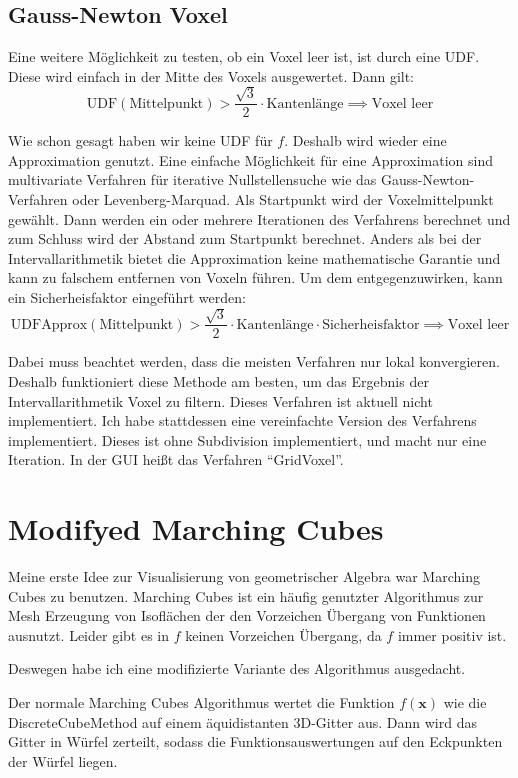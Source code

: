 \documentclass[
	ngerman,%
	accentcolor=9c,%
	ruledheaders=section,%
	class=report,%
	thesis={type=bachelor},%
	fontsize=11pt,%
	parskip=half-,%
	custommargins=true,%
	marginpar=false,%
]{tudapub}
\begin{document}
\subsection{Gauss-Newton Voxel}
Eine weitere Möglichkeit zu testen, ob ein Voxel leer ist, ist durch eine UDF. Diese wird einfach in der Mitte des Voxels ausgewertet. Dann gilt:
\[
\text{UDF}(\text{Mittelpunkt}) > \frac{\sqrt{3}}{2} \cdot \text{Kantenlänge} \implies \text{Voxel leer} 
\]

Wie schon gesagt haben wir keine UDF für \(f\). Deshalb wird wieder eine Approximation genutzt.
Eine einfache Möglichkeit für eine Approximation sind multivariate Verfahren für iterative Nullstellensuche wie das Gauss-Newton-Verfahren oder Levenberg-Marquad.
Als Startpunkt wird der Voxelmittelpunkt gewählt.
Dann werden ein oder mehrere Iterationen des Verfahrens berechnet und zum Schluss wird der Abstand zum Startpunkt berechnet.
Anders als bei der Intervallarithmetik bietet die Approximation keine mathematische Garantie und kann zu falschem entfernen von Voxeln führen.
Um dem entgegenzuwirken, kann ein Sicherheisfaktor eingeführt werden:
\[
\text{UDFApprox}(\text{Mittelpunkt}) > \frac{\sqrt{3}}{2} \cdot \text{Kantenlänge} \cdot \text{Sicherheisfaktor} \implies \text{Voxel leer} 
\]

Dabei muss beachtet werden, dass die meisten Verfahren nur lokal konvergieren. Deshalb funktioniert diese Methode am besten, um das Ergebnis der Intervallarithmetik Voxel zu filtern. Dieses Verfahren ist aktuell nicht implementiert.
\label{sec:udfvoxel} 
Ich habe stattdessen eine vereinfachte Version des Verfahrens implementiert. Dieses ist ohne Subdivision implementiert, und macht nur eine Iteration. In der GUI heißt das Verfahren \enquote{GridVoxel}. 



\section{Modifyed Marching Cubes}


Meine erste Idee zur Visualisierung von geometrischer Algebra war Marching Cubes zu benutzen. 
Marching Cubes ist ein häufig genutzter Algorithmus zur Mesh Erzeugung von Isoflächen der den Vorzeichen Übergang von Funktionen ausnutzt. Leider gibt es in \(f\) keinen Vorzeichen Übergang, da \(f\) immer positiv ist. 

Deswegen habe ich eine modifizierte Variante des Algorithmus ausgedacht.

Der normale Marching Cubes Algorithmus wertet die Funktion \( f(\mathbf{x}) \) wie die DiscreteCubeMethod auf einem äquidistanten 3D-Gitter aus. Dann wird das Gitter in Würfel zerteilt, sodass die Funktionsauswertungen auf den Eckpunkten der Würfel liegen.
\end{document}

